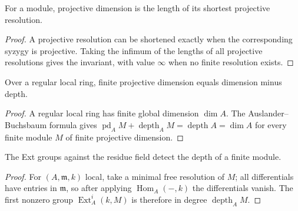 \begin{proposition}\label{ha-ch3-prop-projective-dimension}
For a module, projective dimension is the length of its shortest projective
resolution.

\end{proposition}
\begin{proof}

A projective resolution can be shortened exactly when the corresponding syzygy is projective.  Taking
the infimum of the lengths of all projective resolutions gives the invariant, with value $\infty$
when no finite resolution exists.

\end{proof}
\begin{proposition}\label{ha-ch3-prop-regular-local}
Over a regular local ring, finite projective dimension equals dimension minus
depth.

\end{proposition}
\begin{proof}

A regular local ring has finite global dimension $\dim A$.  The Auslander--Buchsbaum formula gives
$\operatorname{pd}_A M+\operatorname{depth}_A M=\operatorname{depth}A=\dim A$ for every finite module
$M$ of finite projective dimension.

\end{proof}
\begin{proposition}\label{ha-ch3-prop-ext-depth}
The Ext groups against the residue field detect the depth of a finite module.

\end{proposition}
\begin{proof}

For $(A,\mathfrak m,k)$ local, take a minimal free resolution of $M$; all differentials have entries
in $\mathfrak m$, so after applying $\operatorname{Hom}_A(-,k)$ the differentials vanish.  The first
nonzero group $\operatorname{Ext}^i_A(k,M)$ is therefore in degree $\operatorname{depth}_A M$.

\end{proof}

